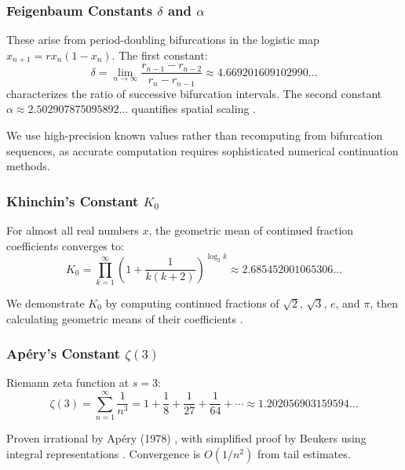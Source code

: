 \documentclass[11pt,a4paper]{article}
\begin{document}
\subsubsection{Feigenbaum Constants $\delta$ and $\alpha$}

These arise from period-doubling bifurcations in the logistic map $x_{n+1} = rx_n(1 - x_n)$. The first constant:
\begin{equation}
\delta = \lim_{n \to \infty} \frac{r_{n-1} - r_{n-2}}{r_n - r_{n-1}} \approx 4.669201609102990\ldots
\end{equation}
characterizes the ratio of successive bifurcation intervals. The second constant $\alpha \approx 2.502907875095892\ldots$ quantifies spatial scaling \citep{feigenbaum1978,wang2025feigenbaum}.

We use high-precision known values rather than recomputing from bifurcation sequences, as accurate computation requires sophisticated numerical continuation methods.

\subsubsection{Khinchin's Constant $K_0$}

For almost all real numbers $x$, the geometric mean of continued fraction coefficients converges to:
\begin{equation}
K_0 = \prod_{k=1}^{\infty} \left( 1 + \frac{1}{k(k+2)} \right)^{\log_2 k} \approx 2.685452001065306\ldots
\end{equation}

We demonstrate $K_0$ by computing continued fractions of $\sqrt{2}$, $\sqrt{3}$, $e$, and $\pi$, then calculating geometric means of their coefficients \citep{wolf2020khinchin}.

\subsubsection{Apéry's Constant $\zeta(3)$}

Riemann zeta function at $s=3$:
\begin{equation}
\zeta(3) = \sum_{n=1}^{\infty} \frac{1}{n^3} = 1 + \frac{1}{8} + \frac{1}{27} + \frac{1}{64} + \cdots \approx 1.202056903159594\ldots
\end{equation}

Proven irrational by Apéry (1978) \citep{apery1979}, with simplified proof by Beukers using integral representations \citep{beukers1979}. Convergence is $O(1/n^2)$ from tail estimates.
\end{document}
